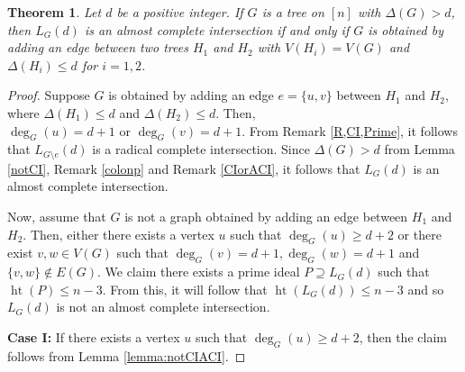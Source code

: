 \documentclass[11pt,a4paper,reqno]{amsart}
\newtheorem{thm}{Theorem}[section]
\theoremstyle{definition}
\numberwithin{equation}{section}
\DeclareMathOperator{\het}{ht}
\begin{document}
\begin{thm} \label{ACI:tree}
    Let $d$ be a positive integer. If $G$ is a tree on $[n]$ with $\Delta(G)>d$, then $L_G(d)$ is an almost complete intersection if and only if $G$ is obtained by adding an edge between two trees $H_1$ and $H_2$ with $V(H_i)=V(G)$ and $\Delta(H_i)\leq d$ for $i=1,2$.
\end{thm}
\begin{proof}
    Suppose $G$ is obtained by adding an edge $e=\{u,v\}$ between $H_1$ and $H_2$, where $\Delta(H_1)\leq d$ and $\Delta(H_2)\leq d$. Then, $\deg_G(u)=d+1 \text{ or } \deg_G(v) = d+1$. From Remark \ref{R,CI,Prime}, it follows that $L_{G\setminus e}(d)$ is a radical complete intersection. Since $\Delta(G)>d$ from Lemma \ref{notCI}, Remark \ref{colonp} and Remark \ref{CIorACI}, it follows that $L_G(d)$ is an almost complete intersection.

    Now, assume that $G$ is not a graph obtained by adding an edge between $H_1$ and $H_2$. Then, either there exists a vertex $u$ such that $\deg_G(u) \geq d+2$ or there exist $v, w \in V(G)$ such that $ \deg_G(v)=d+1, \deg_G(w) = d+1$ and $\{v, w\} \notin E(G)$. We claim there exists a prime ideal $P \supseteq L_G(d)$ such that $\het(P)\leq n-3$. From this, it will follow that $\het(L_G(d)) \leq n-3$ and so $L_G(d)$ is not an almost complete intersection. 

\vspace{1mm}

    \textbf{Case I:} If there exists a vertex $u$ such that $\deg_G(u) \geq d+2$, then the claim follows from Lemma \ref{lemma:notCIACI}.
    
    


\end{proof}
\end{document}
